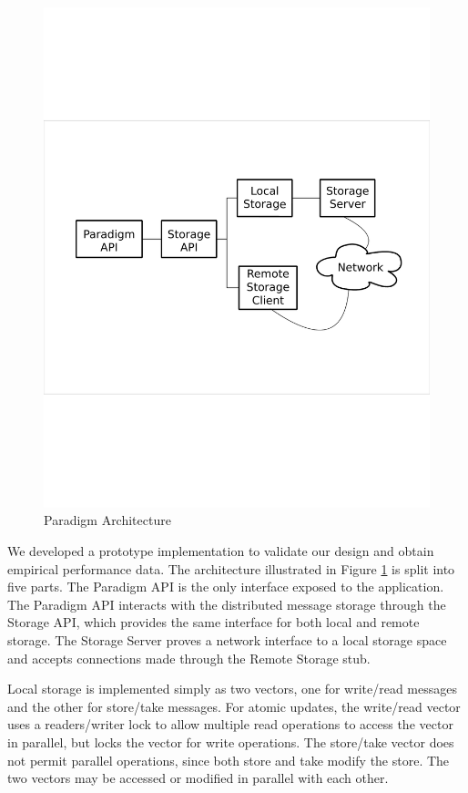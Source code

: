 \documentclass[lnicst]{svmultln}
\begin{document}
\begin{figure}
\centering
\includegraphics[scale = .50, clip, trim = 10px 280px 10px 250px]{figures/paradigm_arch.pdf}
\caption{Paradigm Architecture}
\label{fig:architecture}
\end{figure}

We developed a prototype implementation to validate our design and obtain empirical performance data. The architecture illustrated in Figure \ref{fig:architecture} is split into five parts. The Paradigm API is the only interface exposed to the application. The Paradigm API interacts with the distributed message storage through the Storage API, which provides the same interface for both local and remote storage. The Storage Server proves a network interface to a local storage space and accepts connections made through the Remote Storage stub.

Local storage is implemented simply as two vectors, one for write/read messages and the other for store/take messages. For atomic updates, the write/read vector uses a readers/writer lock to allow multiple read operations to access the vector in parallel, but locks the vector for write operations. The store/take vector does not permit parallel operations, since both store and take modify the store. The two vectors may be accessed or modified in parallel with each other.
\end{document}
